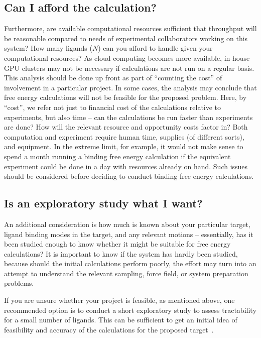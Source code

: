 \documentclass[9pt,bestpractices]{livecoms}
\begin{document}
\subsection{Can I afford the calculation?}
\label{subsec:affordability}
Furthermore, are available computational resources sufficient that throughput will be reasonable compared to needs of experimental collaborators working on
this system? How many ligands ($N$) can you afford to handle given
your computational resources? As cloud computing becomes more available, in-house GPU clusters may not be necessary if calculations are not run on a regular basis.
This analysis should be done up front as part of ``counting the cost''
of involvement in a particular project. In some cases, the analysis may conclude that free energy calculations will not be feasible for the proposed problem.
Here, by ``cost'', we refer not just to financial cost of the calculations relative to experiments, but also time -- can the calculations be run faster than experiments are done? How will the relevant resource and opportunity costs factor in? Both computation and experiment require human time, supplies (of different sorts), and equipment. In the extreme limit, for example, it would not make sense to spend a month running a binding free energy calculation if the equivalent experiment could be done in a day with resources already on hand. Such issues should be considered before deciding to conduct binding free energy calculations.

\subsection{Is an exploratory study what I want?}
\label{subsec:exploration}
An additional consideration is how much is known about your particular
target, ligand binding modes in the target, and any relevant motions
-- essentially, has it been studied enough to know whether it might be
suitable for free energy calculations? It is important to know if the system has hardly been studied, because should the initial calculations perform poorly, the effort may turn into an attempt to understand the relevant sampling, force field, or system preparation problems.

If you are unsure whether your project is feasible, as mentioned above, one recommended option is to conduct a short exploratory study to assess tractability for a small
number of ligands. This can be sufficient to get an initial
idea of feasibility and accuracy of the calculations for the
proposed target~\cite{schindler2020largescale}.
\end{document}
